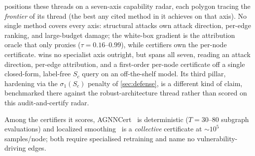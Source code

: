 \begin{table}[t]
\centering
\caption{Threat models and outputs. Only \AEGIS both names vulnerability-driving edges ($\checkmark$ in
``Edges'') \emph{and} returns a per-node certificate (``Cert.''), from one closed-form query. The
certifiers target a \emph{discrete}-edit threat model (a bounded edit \emph{count}), whereas \AEGIS
bounds a \emph{continuous} edge-weight budget $\norm{\delta\Ahat}_F$, so they are complementary rather
than comparable on a single radius axis.}
\label{tab:threat_model}
\footnotesize
\setlength{\tabcolsep}{4pt}
\end{table}

 positions these threads on a seven-axis capability radar, each polygon tracing
the \emph{frontier} of its thread (the best any cited method in it achieves on that axis). No single
method covers every axis: structural attacks own attack direction, per-edge ranking, and large-budget
damage; the white-box gradient is the attribution oracle that \AEGIS only proxies
($\tau{=}0.16$--$0.99$), while certifiers own the per-node certificate. \AEGIS wins no specialist axis
outright, but spans all seven, reading an attack direction, per-edge
attribution, and a first-order per-node certificate off a single closed-form, label-free $S_c$ query on
an off-the-shelf model. Its third pillar, hardening via the $\sigma_1(S_c)$ penalty of
\cref{sec:defense}, is a different kind of claim, benchmarked there against the robust-architecture
thread rather than scored on this audit-and-certify radar.

Among the certifiers it scores, AGNNCert~\citep{li2025agnncert} is deterministic ($T{=}30$--$80$ subgraph evaluations) and localized smoothing~\citep{schuchardt2023localized} is a \emph{collective} certificate at ${\sim}10^5$ samples/node; both require specialised retraining and name no vulnerability-driving edges.

